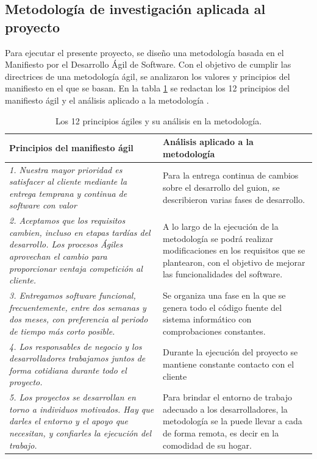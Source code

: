 \subsection{Metodología de investigación aplicada al proyecto}

Para ejecutar el presente proyecto, se diseño una metodología basada en el Manifiesto por el Desarrollo Ágil de Software. Con el objetivo de cumplir las directrices de una metodología ágil, 
se analizaron los valores y principios del manifiesto en el que se basan.
 En la tabla \ref{tab:analisis_principios} se redactan los 12 principios del manifiesto ágil y el análisis aplicado a la metodología \cite{managil}.

\begin{table}[h!]
	\centering
	\caption{Los 12 principios ágiles y su análisis en la metodología.}
	\label{tab:analisis_principios}
	\begin{tabular}{p{7cm}p{7cm}}
		\toprule
		\textbf{Principios del manifiesto ági}l & \textbf{Análisis aplicado a la metodología} \\
		\midrule
		\textit{1. Nuestra mayor prioridad es satisfacer al cliente mediante la entrega temprana y continua de software con valor}  & Para la entrega continua de cambios sobre el desarrollo del guion, se describieron varias fases de desarrollo. \\
		\addlinespace
		\textit{2. Aceptamos que los requisitos cambien, incluso en etapas tardías del desarrollo. Los procesos Ágiles aprovechan el cambio para proporcionar ventaja competición al cliente.}   & A lo largo de la ejecución de la metodología se podrá realizar modificaciones en los requisitos que se plantearon, con el objetivo de mejorar las funcionalidades del software. \\
		\addlinespace
		\textit{3. Entregamos software funcional, frecuentemente, entre dos semanas y dos meses, con preferencia al periodo de tiempo más corto posible.} & Se organiza una fase en la que se genera todo el código fuente del sistema informático con comprobaciones constantes. \\
		\addlinespace
		\textit{4. Los responsables de negocio y los desarrolladores trabajamos juntos de forma cotidiana durante todo el proyecto.} & Durante la ejecución del proyecto se mantiene constante contacto con el cliente \\
		\addlinespace
		\textit{5. Los proyectos se desarrollan en torno a individuos motivados. Hay que darles el entorno y el apoyo que necesitan, y confiarles la ejecución del trabajo.} & Para brindar el entorno de trabajo adecuado a los desarrolladores, la metodología se la puede llevar a cada de forma remota, es decir en la comodidad de su hogar. \\

\end{tabular}
\end{table}

